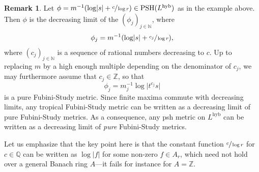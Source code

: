 \documentclass[JEP,XML,SOM,Unicode,published]{cedram}
\theoremstyle{definition}
\newtheorem{rem}[equation]{Remark}
\newcommand \N{\mathbb N}
\newcommand \Q{\mathbb Q}
\newcommand \Z{\mathbb Z}
\newcommand{\hyb}{\mathrm{hyb}}
\DeclareMathOperator{\PSH}{PSH}
\begin{document}
\begin{rem} \label{rem pure} Let $\phi = m^{-1} (\log \lvert s \rvert +\sfrac{c}{\log r}) \in \PSH(L^{\hyb})$ as in the example above. Then $\phi$ is the decreasing limit of the $(\phi_j)_{j \in \N}$, where
\[
\phi_j = m^{-1} (\log \lvert s \rvert +\sfrac{c_j}{\log r}),
\]
where $(c_j)_{j \in \N}$ is a sequence of rational numbers decreasing to $c$. Up to replacing $m$ by a high enough multiple depending on the denominator of $c_j$, we may furthermore assume that $c_j \in \Z$, so that
\[
\phi_j = m_j^{-1} \log \lvert t^{c_j} s \rvert
\]
is a pure Fubini-Study metric. Since finite maxima commute with decreasing limits, any tropical Fubini-Study metric can be written as a decreasing limit of pure Fubini-Study metrics. As a consequence, any psh metric on $L^{\hyb}$ can be written as a decreasing limit of \emph{pure} Fubini-Study metrics.

Let us emphasize that the key point here is that the constant function $\sfrac{c}{\log r}$ for $c \in \Q$ can be written as $\log \lvert f \rvert$ for some non-zero $f \in A_r$, which need not hold over a general Banach ring $A$---it fails for instance for $A=\Z$.
\end{rem}
\end{document}
